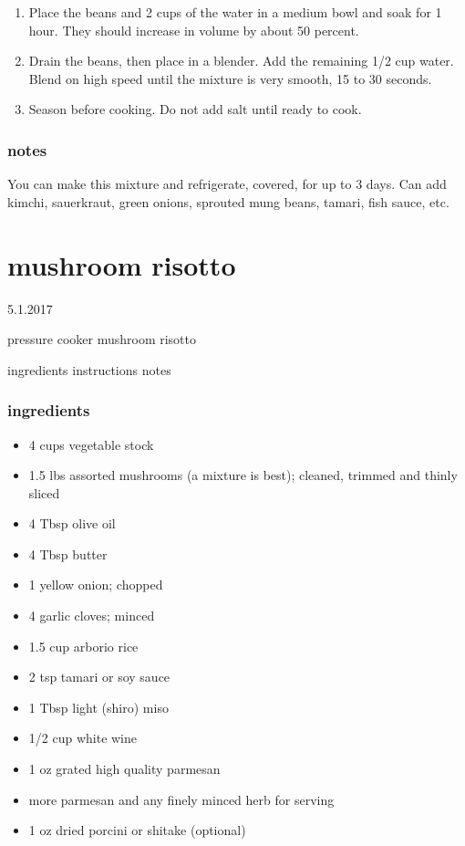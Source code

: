 \documentclass[]{book}
\providecommand{\tightlist}{%
  \setlength{\itemsep}{0pt}\setlength{\parskip}{0pt}}
\begin{document}
\begin{enumerate}
\def\labelenumi{\arabic{enumi}.}
\tightlist
\item
  Place the beans and 2 cups of the water in a medium bowl and
  soak for 1 hour. They should increase in volume by about 50 percent.
\item
  Drain the beans, then place in a blender. Add the remaining 1/2 cup
  water. Blend on high speed until the mixture is very smooth, 15 to 30 seconds.
\item
  Season before cooking. Do not add salt until ready to cook.
\end{enumerate}

\hypertarget{notes-8}{%
\subsection{notes}\label{notes-8}}

You can make this mixture and refrigerate, covered, for up to 3 days. Can add kimchi, sauerkraut, green onions, sprouted
mung beans, tamari, fish sauce, etc.

\hypertarget{mushroom-risotto}{%
\chapter{mushroom risotto}\label{mushroom-risotto}}

5.1.2017

pressure cooker mushroom risotto

ingredients \textbar{}
instructions \textbar{}
notes

\hypertarget{ingredients-9}{%
\subsection{ingredients}\label{ingredients-9}}

\begin{itemize}
\tightlist
\item
  4 cups vegetable stock
\item
  1.5 lbs assorted mushrooms (a mixture is best); cleaned, trimmed and thinly sliced
\item
  4 Tbsp olive oil
\item
  4 Tbsp butter
\item
  1 yellow onion; chopped
\item
  4 garlic cloves; minced
\item
  1.5 cup arborio rice
\item
  2 tsp tamari or soy sauce
\item
  1 Tbsp light (shiro) miso
\item
  1/2 cup white wine
\item
  1 oz grated high quality parmesan
\item
  more parmesan and any finely minced herb for serving
\item
  1 oz dried porcini or shitake (optional)
\end{itemize}
\end{document}

